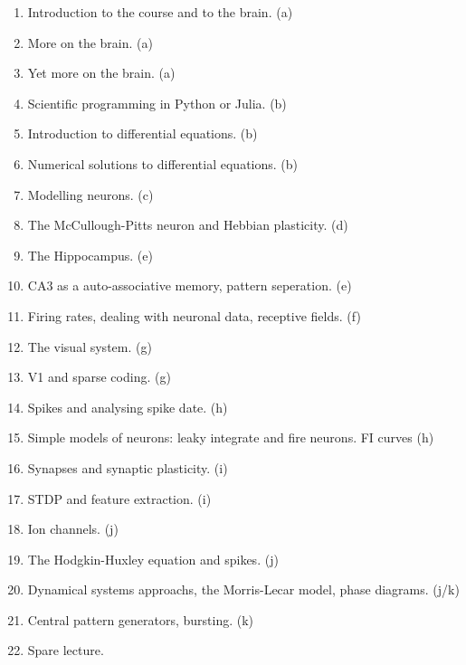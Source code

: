 \documentclass[11pt,a4paper]{scrartcl}
\begin{document}
\begin{enumerate}
\item Introduction to the course and to the brain. (a)
\item More on the brain. (a)

\item Yet more on the brain. (a)
\item Scientific programming in Python or Julia. (b)

\item Introduction to differential equations. (b)
\item Numerical solutions to differential equations. (b)

\item Modelling neurons. (c)
\item The McCullough-Pitts neuron and Hebbian plasticity. (d)

\item The Hippocampus. (e)
\item CA3 as a auto-associative memory, pattern seperation. (e)

\item Firing rates, dealing with neuronal data, receptive fields. (f)
\item The visual system. (g)

\item V1 and sparse coding. (g)
\item Spikes and analysing spike date. (h)

\item Simple models of neurons: leaky integrate and fire neurons. FI curves (h)
\item Synapses and synaptic plasticity. (i)

\item STDP and feature extraction. (i)
\item Ion channels. (j)

\item The Hodgkin-Huxley equation and spikes. (j)
\item Dynamical systems approachs, the Morris-Lecar model, phase diagrams. (j/k)

\item Central pattern generators, bursting. (k)
\item Spare lecture.

\end{enumerate}
\end{document}

